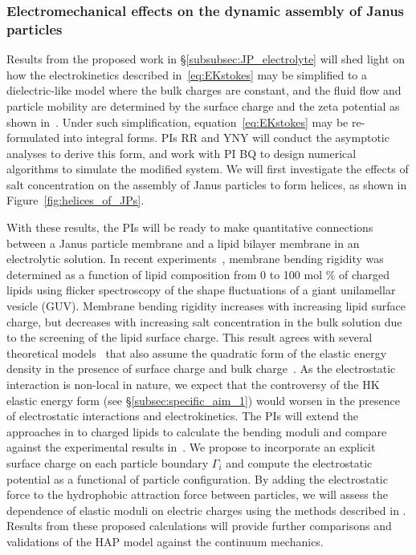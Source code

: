 \subsubsection{Electromechanical effects on the dynamic assembly of Janus particles \label{subsubsec:em_effects}}
Results from the proposed work in \S\ref{subsubsec:JP_electrolyte} will
shed light on how the electrokinetics described in~\eqref{eq:EKstokes}
may be simplified to a dielectric-like model where the bulk charges are
constant, and the fluid flow and particle mobility are determined by the
surface charge and the zeta potential as shown in~\cite{Mori2018_JFM}.
Under such simplification, equation~\eqref{eq:EKstokes} may be
re-formulated into integral forms. PIs RR and YNY will conduct the
asymptotic analyses to derive this form, and work with PI BQ to design
numerical algorithms to simulate the modified system. We will first
investigate the effects of salt concentration on the assembly of Janus
particles to form helices, as shown in Figure~\ref{fig:helices_of_JPs}.

With these results, the PIs will be ready to make quantitative
connections between a Janus particle membrane and a lipid bilayer
membrane in an electrolytic solution. In recent
experiments~\cite{FaizEtAl2019_SoftMatt}, membrane bending rigidity was
determined as a function of lipid composition from 0 to 100 mol $\%$ of
charged lipids using flicker spectroscopy of the shape fluctuations of a
giant unilamellar vesicle (GUV). Membrane bending rigidity increases
with increasing lipid surface charge, but decreases with increasing salt
concentration in the bulk solution due to the screening of the lipid
surface charge. This result agrees with several theoretical
models~\cite{Kralchevsky1996_JCIS, May1996_JChemPhys,
LoubetEtAl2013_PRE} that also assume the quadratic form of the elastic
energy density in the presence of surface charge and bulk
charge~\cite{DuplantierGoldstein1990_PRL, Winterhalter1992_JPC}. As the
electrostatic interaction is non-local in nature, we expect that the
controversy of the HK elastic energy form (see
\S\ref{subsec:specific_aim_1}) would worsen in the presence of
electrostatic interactions and electrokinetics. The PIs will extend the
approaches in \cite{Fu2018_SIAM} to charged lipids to
calculate the bending moduli and compare against the experimental
results in~\cite{FaizEtAl2019_SoftMatt}. We propose to incorporate an
explicit surface charge on each particle boundary $\Gamma_i$ and compute the
electrostatic potential as a functional of particle configuration.  By
adding the electrostatic force to the hydrophobic attraction force
between particles, we will assess the dependence of elastic moduli on
electric charges using the methods described in \cite{Fu2018_SIAM}. Results from these proposed calculations
will provide further comparisons and validations of the HAP model
against the continuum mechanics.

